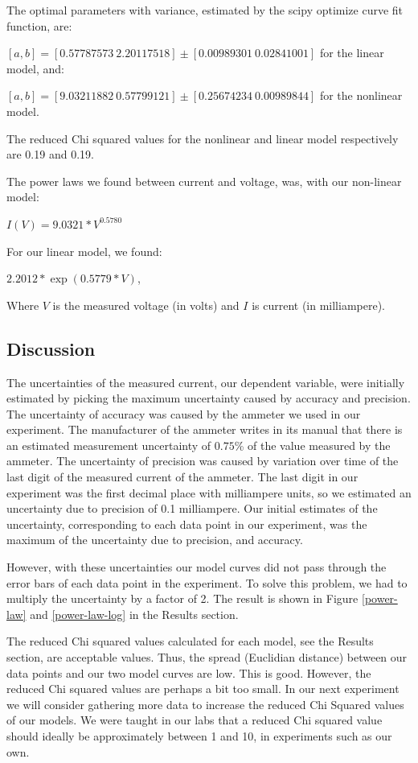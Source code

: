 \documentclass[letterpaper,12pt]{article}
\begin{document}
The optimal parameters with variance, estimated by the scipy optimize curve fit function, are: 

$[a,b] = [0.57787573\ 2.20117518] \pm [0.00989301\ 0.02841001]$  for the linear model, and: 

$[a,b] = [9.03211882\ 0.57799121] \pm [0.25674234\ 0.00989844]$ for the nonlinear model.

The reduced Chi squared values for the nonlinear and linear model respectively are 0.19 and 0.19.

The power laws we found between current and voltage, was, with our non-linear model: 

$I(V)= 9.0321 * V ^ {0.5780} $

For our linear model, we found:  

$2.2012 * \exp( 0.5779 * V )$,

Where $V$ is the measured voltage (in volts) and $I$ is current (in milliampere).

\subsection{Discussion}

The uncertainties of the measured current, our dependent variable, 
were initially estimated by picking the maximum uncertainty caused by accuracy and precision. 
The uncertainty of accuracy was caused by the ammeter we used in our experiment. 
The manufacturer of the ammeter writes in its manual that there is an 
estimated measurement uncertainty of $0.75$\% of the value measured by the ammeter. 
The uncertainty of precision was caused by variation over time of the last digit of 
the measured current of the ammeter. The last digit in our experiment was the first 
decimal place with milliampere units, so we estimated an uncertainty due to precision 
of 0.1 milliampere. Our initial estimates of the uncertainty, corresponding to each
 data point in our experiment, was the maximum of the uncertainty due to precision, and accuracy.

However, with these uncertainties our model curves did not pass through 
the error bars of each data point in the experiment. To solve this problem, 
we had to multiply the uncertainty by a factor of 2. The result is shown in 
Figure \ref{power-law} and \ref{power-law-log} in the Results section.

The reduced Chi squared values calculated for each model, see the Results section, are acceptable values. Thus, the spread (Euclidian distance) between our data points and our two model curves are low. This is good. However, the reduced Chi squared values are perhaps a bit too small. In our next experiment we will consider gathering more data to increase the reduced Chi Squared values of our models. We were taught in our labs that a reduced Chi squared value should ideally be approximately between 1 and 10, in experiments such as our own.
\end{document}
